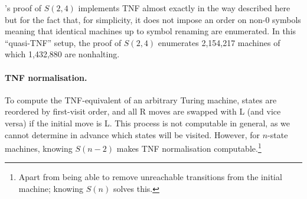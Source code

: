 \CoqBB's proof of $S(2,4)$ implements TNF almost exactly in the way described here but for the fact that, for simplicity, it does not impose an order on non-0 symbols meaning that identical machines up to symbol renaming are enumerated. In this ``quasi-TNF'' setup, the proof of $S(2,4)$ enumerates 2,154,217 machines of which 1,432,880 are nonhalting.





\paragraph{TNF normalisation.} To compute the TNF-equivalent of an arbitrary Turing machine, states are reordered by first-visit order, and all R moves are swapped with L (and vice versa) if the initial move is L. This process is not computable in general, as we cannot determine in advance which states will be visited. However, for $n$-state machines, knowing $S(n-2)$ makes TNF normalisation computable.\footnote{Apart from being able to remove unreachable transitions from the initial machine; knowing $S(n)$ solves this. } %

